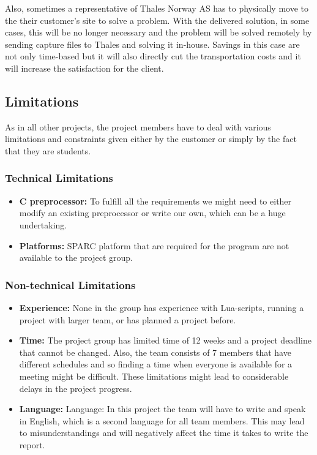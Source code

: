 Also, sometimes a representative of Thales Norway AS has to physically move to the their customer’s site to solve a problem. With the delivered solution, in some cases, this will be no longer necessary and the problem will be solved remotely by sending capture files to Thales and solving it in-house. Savings in this case are not only time-based but it will also directly cut the transportation costs and it will increase the satisfaction for the client.

\subsection{Limitations}
As in all other projects, the project members have to deal with various limitations and constraints given either by the customer or simply by the fact that they are students.

\subsubsection{Technical Limitations}
\begin{itemize}
	\item \textbf{C preprocessor:} To fulfill all the requirements we might need to either modify an existing preprocessor or write our own, which can be a huge undertaking.
	\item \textbf{Platforms:} SPARC platform that are required for the program are not available to the project group. 
\end{itemize}

\subsubsection{Non-technical Limitations}
\begin{itemize}
	\item \textbf{Experience:} None in the group has experience with Lua-scripts, running a project with larger team, or has planned a project before.
	\item \textbf{Time:} The project group has limited time of 12 weeks and a project deadline that cannot be changed. Also, the team consists of 7 members that have different schedules and so finding a time when everyone is available for a meeting might be difficult. These limitations might lead to considerable delays in the project progress.
	\item \textbf{Language:}         Language: In this project the team will have to write and speak in English, which is a second language for all team members. This may lead to misunderstandings and will negatively affect the time it takes to write the report.
\end{itemize}

